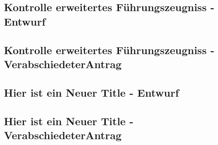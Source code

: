 \documentclass[12pt,a4paper]{scrartcl}
\begin{document}
\subsection*{Kontrolle erweitertes Führungszeugniss - Entwurf} \label{An:1}

\subsection*{Kontrolle erweitertes Führungszeugniss - VerabschiedeterAntrag} \label{An:2}

\subsection*{Hier ist ein Neuer Title - Entwurf} \label{An:3}

\subsection*{Hier ist ein Neuer Title - VerabschiedeterAntrag} \label{An:4}

\end{document}
